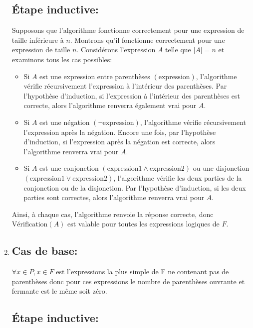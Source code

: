 \documentclass[16pt]{report}
\begin{document}
\begin{multicols*}{2}
\begin{enumerate}
        \subsection*{Étape inductive:}
            Supposons que l'algorithme fonctionne correctement pour une expression de taille inférieure à \(n\). Montrons qu'il fonctionne correctement pour une expression de taille \(n\). Considérons l'expression \(A\) telle que \(|A| = n\) et examinons tous les cas possibles:

            \begin{itemize}
                \item Si \(A\) est une expression entre parenthèses \((\text{expression})\), l'algorithme vérifie récursivement l'expression à l'intérieur des parenthèses. Par l'hypothèse d'induction, si l'expression à l'intérieur des parenthèses est correcte, alors l'algorithme renverra également vrai pour \(A\).
                \item Si \(A\) est une négation \((\lnot\text{expression})\), l'algorithme vérifie récursivement l'expression après la négation. Encore une fois, par l'hypothèse d'induction, si l'expression après la négation est correcte, alors l'algorithme renverra vrai pour \(A\).
                \item Si \(A\) est une conjonction \((\text{expression1}\land\text{expression2})\) ou une disjonction \((\text{expression1}\lor\text{expression2})\), l'algorithme vérifie les deux parties de la conjonction ou de la disjonction. Par l'hypothèse d'induction, si les deux parties sont correctes, alors l'algorithme renverra vrai pour \(A\).
            \end{itemize}

            Ainsi, à chaque cas, l'algorithme renvoie la réponse correcte, donc \(\text{Vérification}(A)\) est valable pour toutes les expressions logiques de \(F\).

            \item
        \subsection*{Cas de base:}

        $\forall x \in P, x \in F$ est l'expressions la plus simple de F ne contenant pas de parenthèses donc pour ces expressions le nombre de parenthèses ouvrante et fermante est le même soit zéro.

        \subsection*{Étape inductive:}


\end{enumerate}
\end{multicols*}
\end{document}
